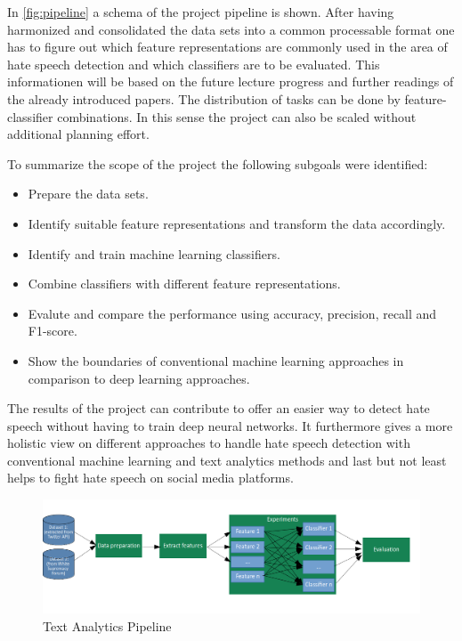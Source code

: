In \autoref{fig:pipeline} a schema of the project pipeline is shown. After having harmonized and consolidated the data sets into a common processable format one has to figure out which feature representations are commonly used in the area of hate speech detection and which classifiers are to be evaluated. This informationen will be based on the future lecture progress and further readings of the already introduced papers. The distribution of tasks can be done by feature-classifier combinations. In this sense the project can also be scaled without additional planning effort.  

\vspace{12pt}
To summarize the scope of the project the following subgoals were iden\-ti\-fied:

\begin{itemize}
	\item Prepare the data sets.
	\item Identify suitable feature representations and transform the data ac\-cord\-ingly.
	\item Identify and train machine learning classifiers.
	\item Combine classifiers with different feature representations.
	\item Evalute and compare the performance using accuracy, precision, recall and F1-score.
	\item Show the boundaries of conventional machine learning approaches in comparison to deep learning approaches.
\end{itemize}

The results of the project can contribute to offer an easier way to detect hate speech without having to train deep neural networks. It furthermore gives a more holistic view on different approaches to handle hate speech detection with conventional machine learning and text analytics methods and last but not least helps to fight hate speech on social media platforms.

\begin{figure}[t]
	\centering
	\includegraphics[width=1.0\textwidth]{./pipeline.png}	
	\caption{Text Analytics Pipeline}
	\label{fig:pipeline}
\end{figure}
